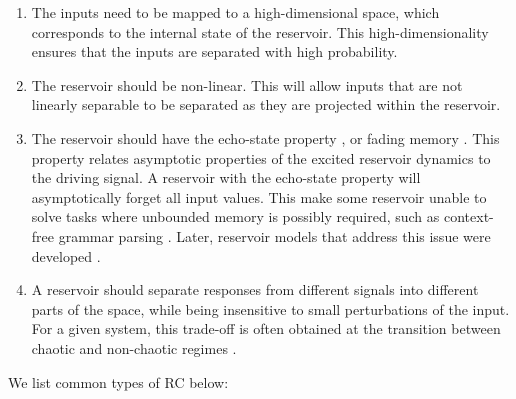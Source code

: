 \begin{enumerate}
  \item The inputs need to be mapped to a high-dimensional space, which
        corresponds to the internal state of the reservoir. This
        high-dimensionality ensures that the inputs are separated with high
        probability.

  \item The reservoir should be non-linear. This will allow inputs that are not
        linearly separable to be separated as they are projected within the
        reservoir.

  \item The reservoir should have the echo-state property
        \parencite{jaegerEchoStateApproach2001, yildizRevisitingEchoState2012},
        or fading memory \parencite{boydFadingMemoryProblem1985,
        maassRealTimeComputingStable2002, maassFadingMemoryKernel2004}. This
        property relates asymptotic properties of the excited reservoir dynamics
        to the driving signal. A reservoir with the echo-state property will
        asymptotically forget all input values. This make some reservoir unable
        to solve tasks where unbounded memory is possibly required, such as
        context-free grammar parsing
        \parencite{schmidhuberTrainingRecurrentNetworks2007}. Later, reservoir
        models that address this issue were developed
        \parencite{pascanuNeurodynamicalModelWorking2011}.

  \item A reservoir should separate responses from different signals into
        different parts of the space, while being insensitive to small
        perturbations of the input. For a given system, this trade-off is often
        obtained at the transition between chaotic and non-chaotic regimes
        \parencite{bertschingerRealtimeComputationEdge2004,
        legensteinEdgeChaosPrediction2007}.
\end{enumerate}

We list common types of \ac{RC} below:

